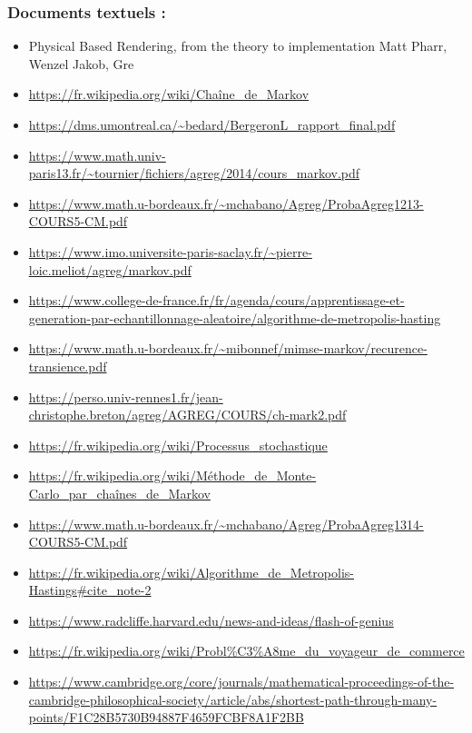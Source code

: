 \documentclass{article}
\begin{document}
\subsubsection{Documents textuels :}
\begin{itemize}
    \item Physical Based Rendering, from the theory to implementation Matt Pharr, Wenzel Jakob, Gre
    \item \url{https://fr.wikipedia.org/wiki/Chaîne_de_Markov}
    \item \url{https://dms.umontreal.ca/~bedard/BergeronL_rapport_final.pdf}
    \item \url{https://www.math.univ-paris13.fr/~tournier/fichiers/agreg/2014/cours_markov.pdf}
    \item \url{https://www.math.u-bordeaux.fr/~mchabano/Agreg/ProbaAgreg1213-COURS5-CM.pdf}
    \item \url{https://www.imo.universite-paris-saclay.fr/~pierre-loic.meliot/agreg/markov.pdf}
    \item \url{https://www.college-de-france.fr/fr/agenda/cours/apprentissage-et-generation-par-echantillonnage-aleatoire/algorithme-de-metropolis-hasting}
    \item \url{https://www.math.u-bordeaux.fr/~mibonnef/mimse-markov/recurence-transience.pdf}
    \item \url{https://perso.univ-rennes1.fr/jean-christophe.breton/agreg/AGREG/COURS/ch-mark2.pdf}
    \item \url{https://fr.wikipedia.org/wiki/Processus_stochastique}
    \item \url{https://fr.wikipedia.org/wiki/Méthode_de_Monte-Carlo_par_chaînes_de_Markov}
    \item \url{https://www.math.u-bordeaux.fr/~mchabano/Agreg/ProbaAgreg1314-COURS5-CM.pdf}
    \item \url{https://fr.wikipedia.org/wiki/Algorithme_de_Metropolis-Hastings#cite_note-2}
    \item \url{https://www.radcliffe.harvard.edu/news-and-ideas/flash-of-genius} \\
    \item \url{https://fr.wikipedia.org/wiki/Probl\%C3\%A8me_du_voyageur_de_commerce}
    \item \url{https://www.cambridge.org/core/journals/mathematical-proceedings-of-the-cambridge-philosophical-society/article/abs/shortest-path-through-many-points/F1C28B5730B94887F4659FCBF8A1F2BB} %
\end{itemize}
\end{document}
